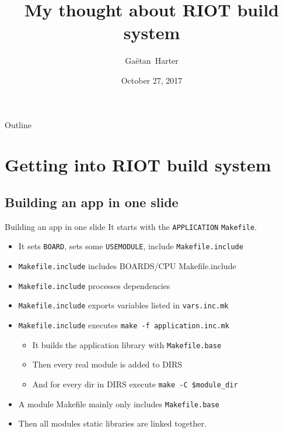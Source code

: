 \documentclass[ucs,9pt]{beamer}
\title
{My thought about RIOT build system}
\author[Gaëtan Harter] %
{Gaëtan~Harter}
\institute[FU Berlin] %
{Freie Universität Berlin}
\date[27/10/2017] %
{October 27, 2017}
\begin{document}
\begin{frame}[plain]
  \titlepage
\end{frame}

\begin{frame}{Outline}
  \tableofcontents
\end{frame}


\section{Getting into RIOT build system}

\subsection{Building an app in one slide}

\begin{frame}{Building an app in one slide}
  It starts with the \texttt{APPLICATION} \texttt{Makefile}.

  \begin{itemize}
    \item \pause
      It sets \texttt{BOARD}, sets some \texttt{USEMODULE}, include \texttt{Makefile.include}

    \item \pause
      \texttt{Makefile.include} includes BOARDS/CPU Makefile.include

    \item \pause
      \texttt{Makefile.include} processes dependencies

    \item \pause
      \texttt{Makefile.include} exports variables listed in \texttt{vars.inc.mk}

    \item \pause
      \texttt{Makefile.include} executes \texttt{make -f application.inc.mk}

      \begin{itemize}
        \item \pause
          It builds the application library with \texttt{Makefile.base}
        \item \pause
          Then every real module is added to DIRS
        \item \pause
          And for every dir in DIRS execute \texttt{make -C \${module\_dir}}
      \end{itemize}

    \item \pause
      A module Makefile mainly only includes \texttt{Makefile.base}

    \item \pause
      Then all modules static libraries are linked together.

  \end{itemize}

\end{frame}
\end{document}
